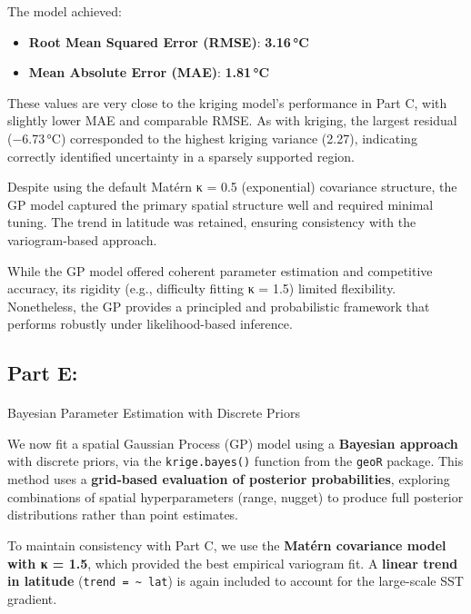 \documentclass[
  11pt,
]{article}
\makeatletter
\let\oldparagraph\paragraph
\renewcommand{\paragraph}{
    \@ifstar
      \xxxParagraphStar
      \xxxParagraphNoStar
  }
\newcommand{\xxxParagraphStar}[1]{\oldparagraph*{#1}\mbox{}}
\newcommand{\xxxParagraphNoStar}[1]{\oldparagraph{#1}\mbox{}}
\makeatother
\begin{document}
The model achieved:

\begin{itemize}
\item
  \textbf{Root Mean Squared Error (RMSE)}: \textbf{3.16\,°C}
\item
  \textbf{Mean Absolute Error (MAE)}: \textbf{1.81\,°C}
\end{itemize}

These values are very close to the kriging model's performance in Part
C, with slightly lower MAE and comparable RMSE. As with kriging, the
largest residual (−6.73\,°C) corresponded to the highest kriging
variance (2.27), indicating correctly identified uncertainty in a
sparsely supported region.

Despite using the default Matérn κ = 0.5 (exponential) covariance
structure, the GP model captured the primary spatial structure well and
required minimal tuning. The trend in latitude was retained, ensuring
consistency with the variogram-based approach.

While the GP model offered coherent parameter estimation and competitive
accuracy, its rigidity (e.g., difficulty fitting κ = 1.5) limited
flexibility. Nonetheless, the GP provides a principled and probabilistic
framework that performs robustly under likelihood-based inference.

\subsection{Part E:}\label{part-e}

\paragraph{Bayesian Parameter Estimation with Discrete
Priors}\label{bayesian-parameter-estimation-with-discrete-priors}

We now fit a spatial Gaussian Process (GP) model using a
\textbf{Bayesian approach} with discrete priors, via the
\texttt{krige.bayes()} function from the \texttt{geoR} package. This
method uses a \textbf{grid-based evaluation of posterior probabilities},
exploring combinations of spatial hyperparameters (range, nugget) to
produce full posterior distributions rather than point estimates.

To maintain consistency with Part C, we use the \textbf{Matérn
covariance model with κ = 1.5}, which provided the best empirical
variogram fit. A \textbf{linear trend in latitude}
(\texttt{trend\ =\ \textasciitilde{}\ lat}) is again included to account
for the large-scale SST gradient.
\end{document}
